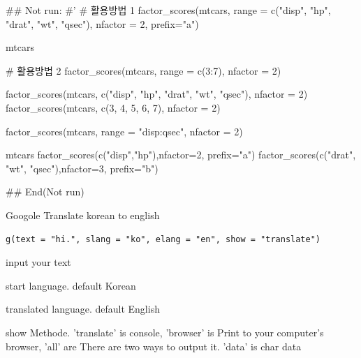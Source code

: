 \documentclass[a4paper]{book}
\begin{document}
\begin{Examples}
\begin{ExampleCode}


\#\# Not run: 
#'
# 활용방법 1
factor_scores(mtcars,
              range = c("disp", "hp", "drat", "wt", "qsec"),
              nfactor = 2, prefix="a")

mtcars %

# 활용방법 2
factor_scores(mtcars, range = c(3:7), nfactor = 2)

factor_scores(mtcars, c("disp", "hp", "drat", "wt", "qsec"), nfactor = 2)
factor_scores(mtcars, c(3, 4, 5, 6, 7), nfactor = 2)

factor_scores(mtcars, range = "disp:qsec", nfactor = 2)


mtcars %
  factor_scores(c("disp","hp"),nfactor=2, prefix="a") %
  factor_scores(c("drat", "wt", "qsec"),nfactor=3, prefix="b") %


## End(Not run)
\end{ExampleCode}
\end{Examples}
%
\begin{Description}
Googole Translate korean to english
\end{Description}
%
\begin{Usage}
\begin{verbatim}
g(text = "hi.", slang = "ko", elang = "en", show = "translate")
\end{verbatim}
\end{Usage}
%
\begin{Arguments}
\begin{ldescription}
\item[\code{text}] input your text

\item[\code{slang}] start language. default Korean

\item[\code{elang}] translated language. default English

\item[\code{show}] show Methode. 'translate' is console, 'browser'  is Print to your computer's browser, 'all' are There are two ways to output it. 'data' is char data
\end{ldescription}
\end{Arguments}
%
\end{document}
